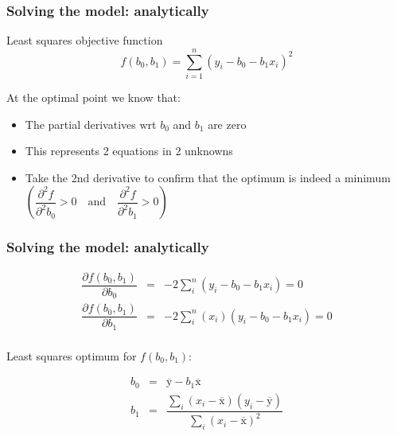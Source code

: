 \begin{frame}\frametitle{Solving the model: analytically}
	\begin{block}{Least squares objective function}
		$$ f(b_0, b_1) = \sum_{i=1}^{n}{\left(y_i - b_0 - b_1 x_i\right)^2} $$
	\end{block}

	At the optimal point we know that:
	\begin{itemize}
		\item	The partial derivatives wrt $b_0$ and $b_1$ are zero
		\item	This represents 2 equations in 2 unknowns
		\item	Take the 2nd derivative to confirm that the optimum is indeed a minimum $\left(\dfrac{
		\partial^2 f}{
		\partial^2 b_0} > 0 \quad \text{and} \quad \dfrac{
		\partial^2 f}{
		\partial^2 b_1} > 0\right)$
	\end{itemize}
\end{frame}

\begin{frame}\frametitle{Solving the model: analytically}

	$$
	\begin{array}{rcl}
		\dfrac{\partial f(b_0, b_1)}{\partial{b_0}} &=& -2 \sum_i^{n}{(y_i - b_0 - b_1 x_i)} = 0 \\
		\dfrac{\partial f(b_0, b_1)}{\partial{b_1}} &=& -2 \sum_i^{n}{(x_i)(y_i - b_0 - b_1 x_i)} = 0 \\
	\end{array}
	$$

	\vspace{12pt}
	Least squares optimum for $f(b_0, b_1)$:

	$$
	\begin{array}{rcl}
		b_0 &=& \overline{\mathrm{y}} - b_1\overline{\mathrm{x}} \\
		b_1 &=& \dfrac{ \sum_i{\left(x_i - \overline{\mathrm{x}}\right)\left(y_i - \overline{\mathrm{y}}\right) } }{ \sum_i{\left( x_i - \overline{\mathrm{x}}\right)^2} }
	\end{array}
	$$
\end{frame}

